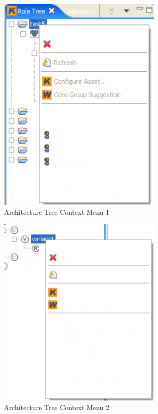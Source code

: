 \begin{figure}[h!]
\begin{center}
\includegraphics[width=8cm]{rolekontext.png}
   \caption{Architecture Tree Context Menu 1}
\label{rolekontext}
\end{center}
\end{figure}\par

\begin{figure}[h!]
\begin{center}
\includegraphics[width=8cm]{rolekontext2.png}
   \caption{Architecture Tree Context Menu 2}
\label{rolekontext2}
\end{center}
\end{figure}\par


